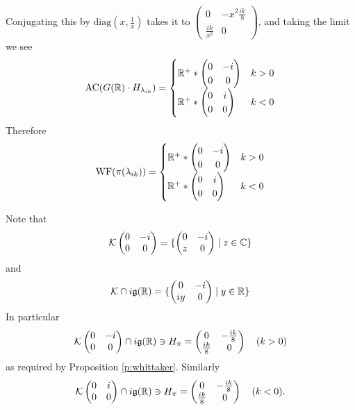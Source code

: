 \documentclass{article}
\theoremstyle{definition}
\numberwithin{equation}{section}
\renewcommand{\-}{\hyp{}}
\newcommand{\g}{\mathfrak g}
\newcommand{\K}{\mathcal K}
\newcommand{\WF}{\mathrm{WF}}
\newcommand{\AC}{\mathrm{AC}}
\begin{document}
Conjugating this by $\mathrm{diag}(x,\frac 1x)$ takes it to
$\begin{pmatrix}0&-x^2\frac{ik}8\\\frac{ik}{x^2}&0
\end{pmatrix}$,
and taking the limit we see
$$
\AC(G(\R)\cdot H_{\lambda_{ik}})=
\begin{cases}
  \R^+*\begin{pmatrix}0&-i\\0&0
  \end{pmatrix}&k>0\\
    \R^+*\begin{pmatrix}0&i\\0&0
  \end{pmatrix}&k<0\\
  \end{cases}
$$
Therefore
$$
\WF(\pi(\lambda_{ik}))
=
\begin{cases}
  \R^+*\begin{pmatrix}0&-i\\0&0
  \end{pmatrix}&k>0\\
    \R^+*\begin{pmatrix}0&i\\0&0
  \end{pmatrix}&k<0\\
  \end{cases}
$$

Note that
$$
\K
\begin{pmatrix}0&-i\\0&0
\end{pmatrix}=\{\begin{pmatrix}0&-i\\z&0
\end{pmatrix}\mid z\in\C\}
$$
and
$$
\K\cap i\g(\R)=
\{\begin{pmatrix}0&-i\\iy&0
\end{pmatrix}\mid y\in\R\}
$$
In particular
$$
\K\begin{pmatrix}0&-i\\0&0\end{pmatrix}\cap i\g(\R)\ni H_\pi=\begin{pmatrix}0&-\frac{ik}8\\\frac{ik}8&0\end{pmatrix}\quad (k>0)
$$
as required by Proposition \ref{p:whittaker}.
Similarly
$$
\K\begin{pmatrix}0&i\\0&0\end{pmatrix}\cap i\g(\R)\ni H_\pi=\begin{pmatrix}0&-\frac{ik}8\\\frac{ik}8&0\end{pmatrix}\quad (k<0).
$$
\end{document}
